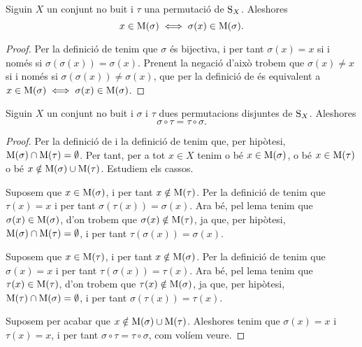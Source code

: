 \documentclass[../Apunts.tex]{subfiles}
\begin{document}
	\begin{lemma}
		\label{lema:permutacions disjuntes commuten}
		Siguin \(X\) un conjunt no buit i \(\tau\) una permutació de \(\operatorname{S}_{X}\). Aleshores
		\[x\in\operatorname{M}(\sigma)\iff\sigma(x)\in\operatorname{M}(\sigma).\]
		\begin{proof}
			Per la definició de  tenim que \(\sigma\) és bijectiva, i per tant \(\sigma(x)=x\) si i només si \(\sigma(\sigma(x))=\sigma(x)\). Prenent la negació d'això trobem que \(\sigma(x)\neq x\) si i només si \(\sigma(\sigma(x))\neq\sigma(x)\), que per la definició de  és equivalent a \(x\in\operatorname{M}(\sigma)\iff\sigma(x)\in\operatorname{M}(\sigma)\).
		\end{proof}
	\end{lemma}
	\begin{theorem}
		\label{thm:permutacions disjuntes commuten}
		Siguin \(X\) un conjunt no buit i \(\sigma\) i \(\tau\) dues permutacions disjuntes de \(\operatorname{S}_{X}\). Aleshores
		\[\sigma\circ\tau=\tau\circ\sigma.\]
		\begin{proof}
			Per la definició de  i la definició de  tenim que, per hipòtesi, \(\operatorname{M}(\sigma)\cap\operatorname{M}(\tau)=\emptyset\). Per tant, per a tot \(x\in X\) tenim o bé \(x\in\operatorname{M}(\sigma)\), o bé \(x\in\operatorname{M}(\tau)\) o bé \(x\notin\operatorname{M}(\sigma)\cup\operatorname{M}(\tau)\). Estudiem els cassos.
			
			Suposem que \(x\in\operatorname{M}(\sigma)\), i per tant \(x\notin\operatorname{M}(\tau)\). Per la definició de  tenim que \(\tau(x)=x\) i per tant \(\sigma(\tau(x))=\sigma(x)\). Ara bé, pel lema  tenim que \(\sigma(x)\in\operatorname{M}(\sigma)\), d'on trobem que \(\sigma(x)\notin\operatorname{M}(\tau)\), ja que, per hipòtesi, \(\operatorname{M}(\sigma)\cap\operatorname{M}(\tau)=\emptyset\), i per tant \(\tau(\sigma(x))=\sigma(x)\).
			
			Suposem que \(x\in\operatorname{M}(\tau)\), i per tant \(x\notin\operatorname{M}(\sigma)\). Per la definició de  tenim que \(\sigma(x)=x\) i per tant \(\tau(\sigma(x))=\tau(x)\). Ara bé, pel lema  tenim que \(\tau(x)\in\operatorname{M}(\tau)\), d'on trobem que \(\tau(x)\notin\operatorname{M}(\sigma)\), ja que, per hipòtesi, \(\operatorname{M}(\tau)\cap\operatorname{M}(\sigma)=\emptyset\), i per tant \(\sigma(\tau(x))=\tau(x)\). %
			
			Suposem per acabar que \(x\notin\operatorname{M}(\sigma)\cup\operatorname{M}(\tau)\). Aleshores tenim que \(\sigma(x)=x\) i \(\tau(x)=x\), i per tant \(\sigma\circ\tau=\tau\circ\sigma\), com volíem veure.
		\end{proof} %
	\end{theorem}
\end{document}
